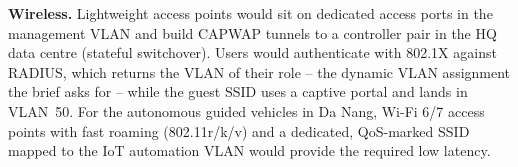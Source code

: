 \textbf{Wireless.} Lightweight access points would sit on dedicated access ports in the management VLAN and
build CAPWAP tunnels \cite{rfc5415} to a controller pair in the HQ data centre (stateful switchover). Users
would authenticate with 802.1X against RADIUS, which returns the VLAN of their role -- the dynamic VLAN
assignment the brief asks for -- while the guest SSID uses a captive portal and lands in VLAN~50. For the
autonomous guided vehicles in Da Nang, Wi-Fi 6/7 access points with fast roaming (802.11r/k/v) and a
dedicated, QoS-marked SSID mapped to the IoT automation VLAN would provide the required low latency.
